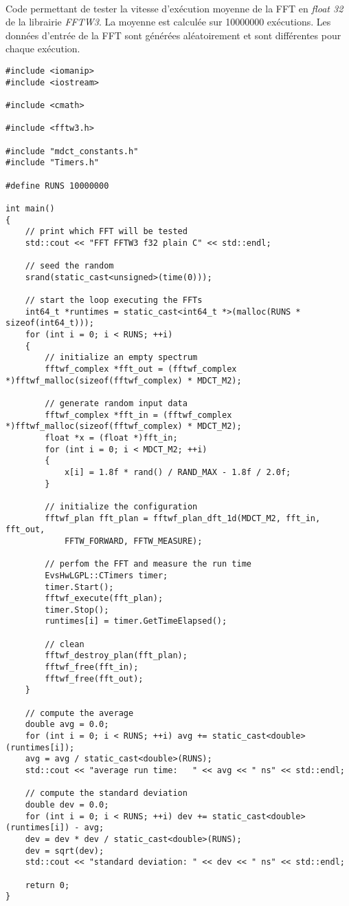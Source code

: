 \documentclass{article}
\begin{document}
\paragraph{}
Code permettant de tester la vitesse d'exécution moyenne de la FFT en \emph{float 32} de la librairie \emph{FFTW3}. La moyenne est calculée sur \SI{10000000}{} exécutions. Les données d'entrée de la FFT sont générées aléatoirement et sont différentes pour chaque exécution.
\lstset{language=C++}
\begin{lstlisting}
#include <iomanip>
#include <iostream>

#include <cmath>

#include <fftw3.h>

#include "mdct_constants.h"
#include "Timers.h"

#define RUNS 10000000

int main()
{
    // print which FFT will be tested
    std::cout << "FFT FFTW3 f32 plain C" << std::endl;

    // seed the random
    srand(static_cast<unsigned>(time(0)));

    // start the loop executing the FFTs
    int64_t *runtimes = static_cast<int64_t *>(malloc(RUNS * sizeof(int64_t)));
    for (int i = 0; i < RUNS; ++i)
    {
        // initialize an empty spectrum
        fftwf_complex *fft_out = (fftwf_complex *)fftwf_malloc(sizeof(fftwf_complex) * MDCT_M2);

        // generate random input data
        fftwf_complex *fft_in = (fftwf_complex *)fftwf_malloc(sizeof(fftwf_complex) * MDCT_M2);
        float *x = (float *)fft_in;
        for (int i = 0; i < MDCT_M2; ++i)
        {
            x[i] = 1.8f * rand() / RAND_MAX - 1.8f / 2.0f;
        }

        // initialize the configuration
        fftwf_plan fft_plan = fftwf_plan_dft_1d(MDCT_M2, fft_in, fft_out,
            FFTW_FORWARD, FFTW_MEASURE);

        // perfom the FFT and measure the run time
        EvsHwLGPL::CTimers timer;
        timer.Start();
        fftwf_execute(fft_plan);
        timer.Stop();
        runtimes[i] = timer.GetTimeElapsed();

        // clean
        fftwf_destroy_plan(fft_plan);
        fftwf_free(fft_in);
        fftwf_free(fft_out);
    }

    // compute the average
    double avg = 0.0;
    for (int i = 0; i < RUNS; ++i) avg += static_cast<double>(runtimes[i]);
    avg = avg / static_cast<double>(RUNS);
    std::cout << "average run time:   " << avg << " ns" << std::endl;

    // compute the standard deviation
    double dev = 0.0;
    for (int i = 0; i < RUNS; ++i) dev += static_cast<double>(runtimes[i]) - avg;
    dev = dev * dev / static_cast<double>(RUNS);
    dev = sqrt(dev);
    std::cout << "standard deviation: " << dev << " ns" << std::endl;

    return 0;
}
\end{lstlisting}
\end{document}

